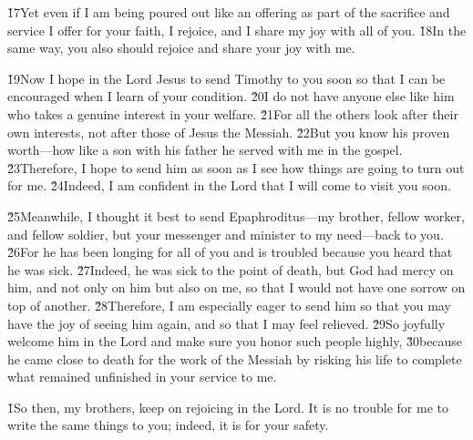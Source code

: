 \v{17}Yet even if I am being poured out like an offering as part of the sacrifice and service I offer for your faith, I rejoice, and I share my joy with all of you. \v{18}In the same way, you also should rejoice and share your joy with me.

\v{19}Now I hope in the Lord Jesus to send Timothy to you soon so that I can be encouraged when I learn of your condition. \v{20}I do not have anyone else like him who takes a genuine interest in your welfare. \v{21}For all the others look after their own interests, not after those of Jesus the Messiah. \v{22}But you know his proven worth---how like a son with his father he served with me in the gospel. \v{23}Therefore, I hope to send him as soon as I see how things are going to turn out for me. \v{24}Indeed, I am confident in the Lord that I will come to visit you soon.

\v{25}Meanwhile, I thought it best to send Epaphroditus---my brother, fellow worker, and fellow soldier, but your messenger and minister to my need---back to you. \v{26}For he has been longing for all of you and is troubled because you heard that he was sick. \v{27}Indeed, he was sick to the point of death, but God had mercy on him, and not only on him but also on me, so that I would not have one sorrow on top of another. \v{28}Therefore, I am especially eager to send him so that you may have the joy of seeing him again, and so that I may feel relieved. \v{29}So joyfully welcome him in the Lord and make sure you honor such people highly, \v{30}because he came close to death for the work of the Messiah by risking his life to complete what remained unfinished in your service to me.

\v{1}So then, my brothers, keep on rejoicing in the Lord. It is no trouble for me to write the same things to you; indeed, it is for your safety.

